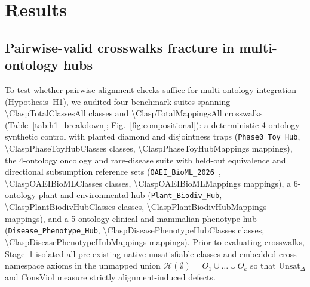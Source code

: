 \documentclass[10pt]{article}
\theoremstyle{accentdef}
\begin{document}
\section*{Results}

\subsection*{Pairwise-valid crosswalks fracture in multi-ontology hubs}

To test whether pairwise alignment checks suffice for multi-ontology integration (Hypothesis~H1), we audited four benchmark suites spanning \num{\ClaspTotalClassesAll} classes and \num{\ClaspTotalMappingsAll} crosswalks (Table~\ref{tab:h1_breakdown}; Fig.~\ref{fig:compositional}): a deterministic 4-ontology synthetic control with planted diamond and disjointness traps (\texttt{Phase0\_Toy\_Hub}, \num{\ClaspPhaseToyHubClasses} classes, \num{\ClaspPhaseToyHubMappings} mappings), the 4-ontology oncology and rare-disease suite with held-out equivalence and directional subsumption reference sets (\texttt{OAEI\_BioML\_2026}~\cite{he2022bioml}, \num{\ClaspOAEIBioMLClasses} classes, \num{\ClaspOAEIBioMLMappings} mappings), a 6-ontology plant and environmental hub (\texttt{Plant\_Biodiv\_Hub}, \num{\ClaspPlantBiodivHubClasses} classes, \num{\ClaspPlantBiodivHubMappings} mappings), and a 5-ontology clinical and mammalian phenotype hub (\texttt{Disease\_Phenotype\_Hub}, \num{\ClaspDiseasePhenotypeHubClasses} classes, \num{\ClaspDiseasePhenotypeHubMappings} mappings). Prior to evaluating crosswalks, Stage~1 isolated all pre-existing native unsatisfiable classes and embedded cross-namespace axioms in the unmapped union $\mathcal{H}(\emptyset) = O_1 \cup \dots \cup O_k$ so that $\mathrm{Unsat}_{\Delta}$ and $\mathrm{ConsViol}$ measure strictly alignment-induced defects.
\end{document}
